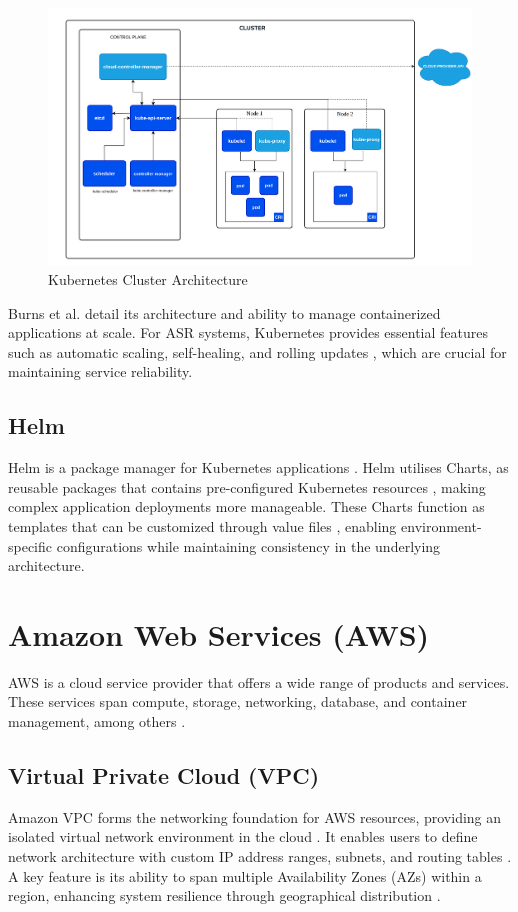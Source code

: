 \begin{figure}[H]
    \centering
    \includegraphics[width=\textwidth]{figures/kubernetes_architecture.png}
    \caption{Kubernetes Cluster Architecture \cite{k8s_cluster}}
    \label{fig:kubernetes_architecture}
\end{figure}

Burns et al. \cite{k8s_architecture} detail its architecture and ability to manage containerized applications at scale. For ASR systems, Kubernetes provides essential features such as automatic scaling, self-healing, and rolling updates \cite{k8s_features}, which are crucial for maintaining service reliability.

\subsection{Helm}
Helm is a package manager for Kubernetes applications \cite{helm_definition}. Helm utilises Charts, as reusable packages that contains pre-configured Kubernetes resources \cite{helm_charts}, making complex application deployments more manageable. These Charts function as templates that can be customized through value files \cite{helm_definition}, enabling environment-specific configurations while maintaining consistency in the underlying architecture.

\section{Amazon Web Services (AWS)}
AWS is a cloud service provider that offers a wide range of products and services. These services span compute, storage, networking, database, and container management, among others \cite{aws_definition}.

\subsection{Virtual Private Cloud (VPC)}
Amazon VPC forms the networking foundation for AWS resources, providing an isolated virtual network environment in the cloud \cite{vpc}. It enables users to define network architecture with custom IP address ranges, subnets, and routing tables \cite{vpc}. A key feature is its ability to span multiple Availability Zones (AZs) within a region, enhancing system resilience through geographical distribution \cite{vpc_az}.

